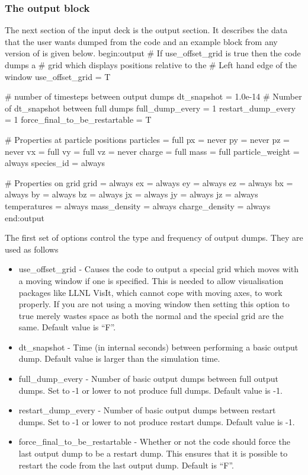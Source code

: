 \documentclass[12pt,a4paper]{article}
\newcommand{\EPOCH}{{\color{warwickdark}\fontfamily{phv}\selectfont{EPOCH}}}
\newenvironment{boxverbatim}{\lboxverbatim{none}}{\endlboxverbatim}
\begin{document}
\subsubsection{The output block}
The next section of the input deck is the output section. It describes the
data that the user wants dumped from the code and an example block from any
version of {\EPOCH} is given below.
\begin{boxverbatim}
begin:output
   # If use_offset_grid is true then the code dumps a
   # grid which displays positions relative to the
   # Left hand edge of the window
   use_offset_grid = T

   # number of timesteps between output dumps
   dt_snapshot = 1.0e-14
   # Number of dt_snapshot between full dumps
   full_dump_every = 1
   restart_dump_every = 1
   force_final_to_be_restartable = T

   # Properties at particle positions
   particles = full
   px = never
   py = never
   pz = never
   vx = full
   vy = full
   vz = never
   charge = full
   mass = full
   particle_weight = always
   species_id = always

   # Properties on grid
   grid = always
   ex = always
   ey = always
   ez = always
   bx = always
   by = always
   bz = always
   jx = always
   jy = always
   jz = always
   temperatures = always
   mass_density = always
   charge_density = always
end:output
\end{boxverbatim}

The first set of options control the type and frequency of output dumps. They
are used as follows\\
\begin{itemize}
\item use\_offset\_grid - Causes the code to output a special grid which moves
  with a moving window if one is specified. This is needed to allow
  visualisation packages like LLNL VisIt, which cannot cope with moving axes, to
  work properly. If you are not using a moving window then setting this option
  to true merely wastes space as both the normal and the special grid are the
  same. Default value is ``F''.
\item dt\_snapshot - Time (in internal seconds) between performing a basic
  output dump. Default value is larger than the simulation time.
\item full\_dump\_every - Number of basic output dumps between full output
  dumps. Set to -1 or lower to not produce full dumps. Default value is -1.
\item restart\_dump\_every - Number of basic output dumps between restart
  dumps. Set to -1 or lower to not produce restart dumps. Default value is -1.
\item force\_final\_to\_be\_restartable - Whether or not the code should force
  the last output dump to be a restart dump. This ensures that it is possible
  to restart the code from the last output dump. Default is ``F''.
\end{itemize}
\end{document}
